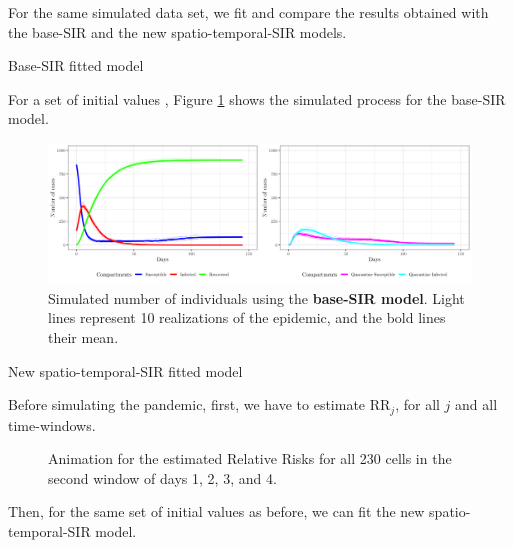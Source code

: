 \documentclass[12pt]{beamer}
\begin{document}
\begin{frame}[t]
\begin{columns}[t]
\begin{column}{0.30\textwidth}
				For the same simulated data set, we fit and compare the results obtained with the base-SIR and the new spatio-temporal-SIR models.\vspace{18pt}
			
				{\large \textcolor{title-fg}{Base-SIR fitted model}} \vspace{12pt}
				
				For a set of initial values \cite{hernandez2020evaluating}, Figure \ref{fig:fitted-base} shows the simulated process for the base-SIR model.
				
				\begin{figure}[!ht]
					\centering
					\includegraphics[width = 1\textwidth]{Images/fitted-base}
					\caption{\justifying Simulated number of individuals using the \textbf{base-SIR model}. Light lines represent 10 realizations of the epidemic, and the bold lines their mean.}
					\label{fig:fitted-base}
				\end{figure}\vspace{-6pt}
				
				{\large \textcolor{title-fg}{New spatio-temporal-SIR fitted model}} \vspace{12pt}
				
				Before simulating the pandemic, first, we have to estimate $\text{RR}_j$, for all $j$ and all time-windows.
				
				\begin{figure}[!ht]
					\centering
					\vspace{6pt}
					\caption{\justifying Animation for the estimated Relative Risks for all 230 cells in the second window of days 1, 2, 3, and 4.}
					\label{fig:estimated-rr}
				\end{figure}\vspace{-12pt}
			
				Then, for the same set of initial values as before, we can fit the new spatio-temporal-SIR model.
				

\end{column}
\end{columns}
\end{frame}
\end{document}
